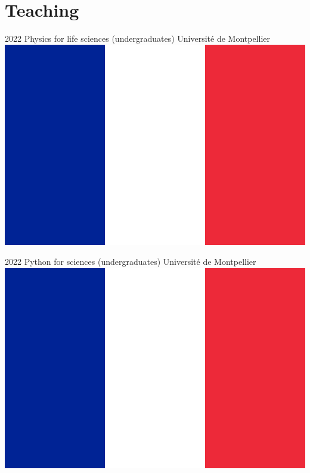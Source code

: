 \documentclass[a4paper]{cvtemplate_en} %
\begin{document}
\section{Teaching}

\begin{cvbody}

\cvitem
	{2022}
	{}
	{Physics for life sciences (undergraduates)}
	{Université de Montpellier \includegraphics[height=0.8\myheight]{fr}\vspace{-5pt}}
	{}{}{}
	{}
	{\vspace{5pt}}

\cvitem
	{2022}
	{}
	{Python for sciences (undergraduates)}
	{Université de Montpellier \includegraphics[height=0.8\myheight]{fr}}
	{}{}{}
	{}
	{\vspace{5pt}}


\end{cvbody}
\end{document}
